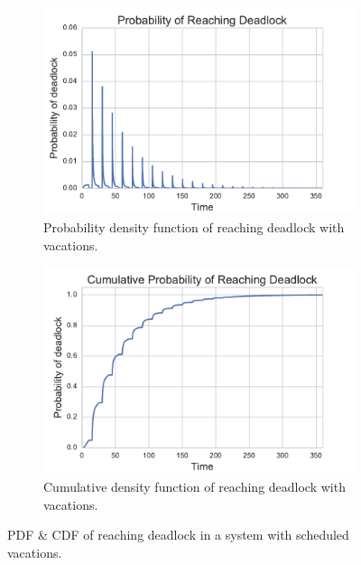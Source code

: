 \documentclass{article}
\begin{document}
\begin{figure}[!hbtp]
\begin{center}
\begin{subfigure}[b]{0.45\textwidth}
    \includegraphics[width=\textwidth]{img/pdf_initial.pdf}
    \caption{Probability density function of reaching deadlock with vacations.}
    \label{fig:pdfinitial}
\end{subfigure}
\begin{subfigure}[b]{0.45\textwidth}
    \includegraphics[width=\textwidth]{img/cdf_initial.pdf}
    \caption{Cumulative density function of reaching deadlock with vacations.}
    \label{fig:cdfinitial}
\end{subfigure}
\end{center}
\caption{PDF \& CDF of reaching deadlock in a system with scheduled vacations.}
\label{fig:pdfcdf_initial}
\end{figure}
\end{document}
